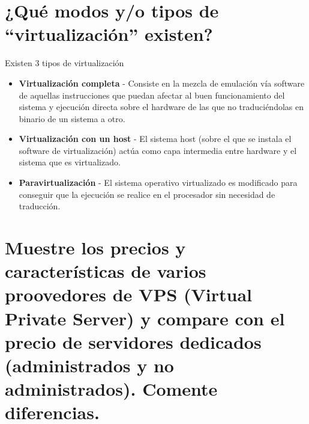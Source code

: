 \section{¿Qué modos y/o tipos de ``virtualización'' existen?}
Existen 3 tipos de virtualización \cite{c1-1}
\begin{itemize}
	\item \textbf{Virtualización completa} - Consiste en la mezcla de emulación vía software de aquellas instrucciones que puedan afectar al buen funcionamiento del sistema y ejecución directa sobre el hardware de las que no traduciéndolas en binario de un sistema a otro.
	
	\item \textbf{Virtualización con un host} - El sistema host (sobre el que se instala el software de virtualización) actúa como capa intermedia entre hardware y el sistema que es virtualizado.
	
	\item \textbf{Paravirtualización} - El sistema operativo  virtualizado es modificado para conseguir que la ejecución se realice en el procesador sin necesidad de traducción.
\end{itemize}



\section{Muestre los precios y características de varios proovedores de VPS (Virtual Private Server) y compare con el precio de servidores dedicados (administrados y no administrados). Comente diferencias.}

